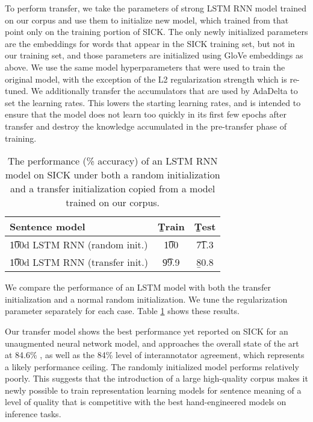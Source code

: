 To perform transfer, we take the parameters of strong LSTM RNN model trained on our corpus and use them to initialize new model, which trained from that point only on the training portion of SICK. The only newly initialized parameters are the embeddings for words that appear in the SICK training set, but not in our training set, and those parameters are initialized using GloVe embeddings as above. We use the same model hyperparameters that were used to train the original model, with the exception of the L2 regularization strength which is re-tuned. We additionally transfer the accumulators that are used by AdaDelta to set the learning rates. This lowers the starting learning rates, and is intended to ensure that the model does not learn too quickly in its first few epochs after transfer and destroy the knowledge accumulated in the pre-transfer phase of training.

\begin{table}
\begin{center}
\begin{tabular}{l@{\hskip \colspaceL}@{\hskip \colspaceL}c@{\hskip \colspaceL}c}
\hline
\textbf{Sentence model} & \b{Train}  & \b{Test}\\
\hline
\t{100d LSTM RNN (random init.)}            & \t{100} & \t{71.3} \\

\t{100d LSTM RNN (transfer init.)}            & \t{99.9} & \b{80.8} \\
\hline
\end{tabular}
\end{center}

\caption{\label{tab:transferresults}
The performance (\% accuracy) of an LSTM RNN model on SICK under both a random initialization and a transfer initialization copied from a model trained on our corpus.} 
\end{table}

We compare the performance of an LSTM model with both the transfer initialization and a normal random initialization. We tune the regularization parameter separately for each case. Table \ref{tab:transferresults} shows these results.

Our transfer model shows the best performance yet reported on SICK for an unaugmented neural network model, and approaches the overall state of the art at 84.6\% \cite{lai2014illinois}, as well as the 84\% level of interannotator agreement, which represents a likely performance ceiling. The randomly initialized model performs relatively poorly. This suggests that the introduction of a large high-quality corpus makes it newly possible to train representation learning models for sentence meaning of a level of quality that is competitive with the best hand-engineered models on inference tasks.


